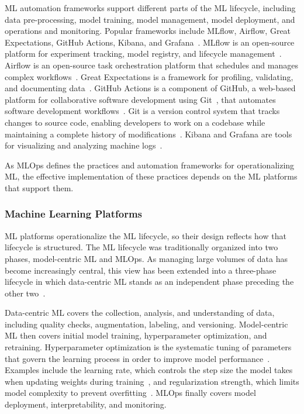 \documentclass[
english,                 %
bibtex,                  %
]{kththesis}
\numberwithin{listing}{chapter}
\begin{document}
\Gls{ML} automation frameworks support different parts of the \gls{ML} lifecycle, including data pre-processing, model training, model management, model deployment, and operations and monitoring. Popular frameworks include \gls{ML}flow, Airflow, Great Expectations, GitHub Actions, Kibana, and Grafana~\cite{ruf_demystifying_2021}. \gls{ML}flow is an open-source platform for experiment tracking, model registry, and lifecycle management~\cite{zaharia_accelerating_2018}. Airflow is an open-source task orchestration platform that schedules and manages complex workflows~\cite{the_apache_software_foundation_airflow_2026}. Great Expectations is a framework for profiling, validating, and documenting data~\cite{gong_great_2026}. GitHub Actions is a component of GitHub, a web-based platform for collaborative software development using Git~\cite{github_inc_build_2026}, that automates software development workflows~\cite{github_inc_github_2026}. Git is a version control system that tracks changes to source code, enabling developers to work on a codebase while maintaining a complete history of modifications~\cite{the_linux_foundation_git_2026}. Kibana and Grafana are tools for visualizing and analyzing machine logs~\cite{elasticsearch_bv_kibana_2026, grafana_labs_grafana_2026}.

As \gls{MLOps} defines the practices and automation frameworks for operationalizing \gls{ML}, the effective implementation of these practices depends on the \gls{ML} platforms that support them.

\subsubsection{Machine Learning Platforms}
\label{sec:bg_mlplat}

\Gls{ML} platforms operationalize the \gls{ML} lifecycle, so their design reflects how that lifecycle is structured. The \gls{ML} lifecycle was traditionally organized into two phases, model-centric \gls{ML} and \gls{MLOps}. As managing large volumes of data has become increasingly central, this view has been extended into a three-phase lifecycle in which data-centric \gls{ML} stands as an independent phase preceding the other two~\cite{singh_systematic_2023}.

Data-centric \gls{ML} covers the collection, analysis, and understanding of data, including quality checks, augmentation, labeling, and versioning. Model-centric \gls{ML} then covers initial model training, hyperparameter optimization, and retraining. Hyperparameter optimization is the systematic tuning of parameters that govern the learning process in order to improve model performance~\cite{bergstra_random_2012}. Examples include the learning rate, which controls the step size the model takes when updating weights during training~\cite{goodfellow_deep_2016}, and regularization strength, which limits model complexity to prevent overfitting~\cite{hoerl_ridge_2000}. \Gls{MLOps} finally covers model deployment, interpretability, and monitoring.
\end{document}
